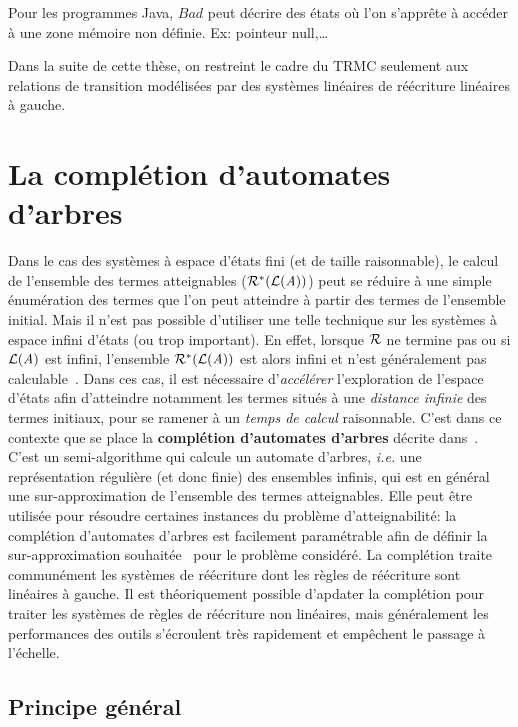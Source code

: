 Pour les programmes Java, $Bad$ peut décrire des états où l'on
s'apprête à accéder à une zone mémoire non définie. Ex: pointeur null,\dots

Dans la suite de cette thèse, on restreint le cadre du TRMC seulement
aux relations de transition modélisées par des systèmes linéaires de
réécriture linéaires à gauche.

\section{La complétion d'automates d'arbres}
\label{sec:completion}
Dans le cas des systèmes à espace d'états fini (et de taille
raisonnable), le calcul de l'ensemble des termes atteignables
($\mathcal R^*(\mathcal{L}(\mathit A))$) peut se réduire à une simple énumération des
termes que l'on peut atteindre à partir des termes de l'ensemble
initial.  Mais il n'est pas possible d'utiliser une telle
technique sur les systèmes à espace infini d'états (ou trop
important). En effet, lorsque $\mathcal R$ ne termine pas ou si 
$\mathcal{L}(\mathit A)$ est infini, l'ensemble $\mathcal R^*(\mathcal{L}(\mathit A))$ est
alors infini et n'est généralement pas calculable~\cite{GilleronTison-FI95}.
Dans ces cas, il est nécessaire d'\textit{accélérer} l'exploration de
l'espace d'états afin d'atteindre notamment les termes situés à une
\textit{distance infinie} des termes initiaux, pour se ramener à un 
\textit{temps de calcul} raisonnable.
C'est dans ce contexte que se place la \textbf{complétion d'automates d'arbres}
décrite dans~\cite{Genet-RTA98,FeuilladeGVTT-JAR04}.
C'est un semi-algorithme qui calcule un automate d'arbres, \textit{i.e.} une représentation
régulière (et donc finie) des ensembles infinis, qui est en général
une sur-approximation de l'ensemble des termes atteignables.
Elle peut être utilisée pour résoudre certaines instances du problème d'atteignabilité:
la complétion d'automates d'arbres est facilement paramétrable afin de définir 
la sur-approximation souhaitée~\cite{Genet-RTA98,FeuilladeGVTT-JAR04,Takai-RTA04}
pour le problème considéré. La complétion traite communément les systèmes de 
réécriture dont les règles de réécriture sont linéaires à gauche. Il est 
théoriquement possible d'apdater la complétion pour traiter les systèmes 
de règles de réécriture non linéaires, mais généralement les performances
des outils s'écroulent très rapidement et empêchent le passage à l'échelle.

\subsection{Principe général}

